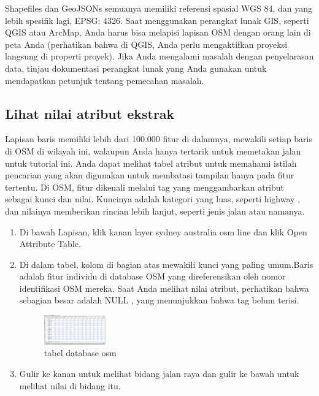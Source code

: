 Shapefiles dan GeoJSONs semuanya memiliki referensi spasial WGS 84, dan yang lebih spesifik lagi, EPSG: 4326. Saat menggunakan perangkat lunak GIS, seperti QGIS atau ArcMap, Anda harus bisa melapisi lapisan OSM dengan orang lain di peta Anda (perhatikan bahwa di QGIS, Anda perlu mengaktifkan proyeksi langsung di properti proyek). Jika Anda mengalami masalah dengan penyelarasan data, tinjau dokumentasi perangkat lunak yang Anda gunakan untuk mendapatkan petunjuk tentang pemecahan masalah.

\subsection{Lihat nilai atribut ekstrak}

Lapisan baris memiliki lebih dari 100.000 fitur di dalamnya, mewakili setiap baris di OSM di wilayah ini, walaupun Anda hanya tertarik untuk memetakan jalan untuk tutorial ini. Anda dapat melihat tabel atribut untuk memahami istilah pencarian yang akan digunakan untuk membatasi tampilan hanya pada fitur tertentu.
Di OSM, fitur dikenali melalui tag yang menggambarkan atribut sebagai kunci dan nilai. Kuncinya adalah kategori yang luas, seperti highway , dan nilainya memberikan rincian lebih lanjut, seperti jenis jalan atau namanya.
\begin{enumerate}
\item
Di bawah Lapisan, klik kanan layer sydney australia osm line dan klik Open Attribute Table.
\item
Di dalam tabel, kolom di bagian atas mewakili kunci yang paling umum.Baris adalah fitur individu di database OSM yang direferensikan oleh nomor identifikasi OSM mereka. Saat Anda melihat nilai atribut, perhatikan bahwa sebagian besar adalah NULL , yang menunjukkan bahwa tag belum terisi.

\begin{figure}[ht]
\centerline{\includegraphics[width=0.25\textwidth]{figures/tabelosm}}
\caption{tabel database osm}
\label {tabelosm}
\end{figure}

 \item
Gulir ke kanan untuk melihat bidang jalan raya dan gulir ke bawah untuk melihat nilai di bidang itu.
\end{enumerate}

